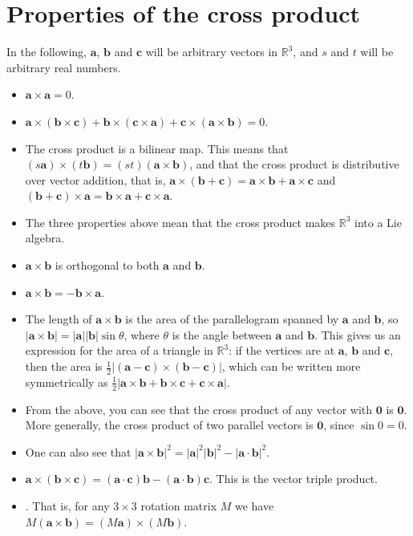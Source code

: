 \documentclass{article}
\def\R{\mathbb{R}}
\def\vec#1{\mathbf{#1}}   %
\begin{document}
\section*{Properties of the cross product}
In the following, $\vec{a}$, $\vec{b}$ and $\vec{c}$ will be arbitrary vectors in $\R^3$, and $s$ and $t$ will be arbitrary real numbers.
\begin{itemize}
\item $\vec{a}\times\vec{a}=0$.
\item $\vec{a}\times(\vec{b}\times\vec{c})+\vec{b}\times(\vec{c}\times\vec{a})
+\vec{c}\times(\vec{a}\times\vec{b})=0$.
\item The cross product is a bilinear map.
This means that $(s\vec{a})\times(t\vec{b})=(st)(\vec{a}\times\vec{b})$,
and that the cross product is distributive over vector addition,
that is, $\vec{a}\times(\vec{b}+\vec{c})=\vec{a}\times\vec{b}+\vec{a}\times\vec{c}$
and
$(\vec{b}+\vec{c})\times\vec{a}=\vec{b}\times\vec{a}+\vec{c}\times\vec{a}$.
\item The three properties above mean that the cross product makes $\R^3$ into a Lie algebra.
\item $\vec{a}\times\vec{b}$ is orthogonal to both $\vec{a}$ and $\vec{b}$.
\item $\vec{a}\times\vec{b}=-\vec{b}\times\vec{a}$.
\item The length of $\vec{a}\times\vec{b}$ is the area of the parallelogram spanned by $\vec{a}$ and $\vec{b}$, so $|\vec{a}\times\vec{b}|=|\vec{a}||\vec{b}|\sin\theta$, where $\theta$ is the angle between $\vec{a}$ and $\vec{b}$. This gives us an expression for the area of a triangle in $\R^3$: if the vertices are at $\vec{a}$, $\vec{b}$ and $\vec{c}$, then the area is $\frac{1}{2}|(\vec{a}-\vec{c})\times(\vec{b}-\vec{c})|$, which can be written more symmetrically as  $\frac{1}{2}|\vec{a}\times\vec{b}+\vec{b}\times\vec{c}+\vec{c}\times\vec{a}|$.
\item From the above, you can see that the cross product of any vector with $\vec{0}$ is $\vec{0}$. More generally, the cross product of two parallel vectors is $\vec{0}$, since $\sin 0 = 0$.
\item One can also see that $|\vec{a}\times \vec{b}|^2=|\vec{a}|^2|\vec{b}|^2-|\vec{a}\cdot \vec{b}|^2$.
\item $\vec{a}\times(\vec{b}\times\vec{c})
=(\vec{a}\cdot\vec{c})\vec{b}-(\vec{a}\cdot\vec{b})\vec{c}$.
This is the vector triple product.
\item {}.
That is, for any $3\times 3$ rotation matrix $M$ we have
$M(\vec{a}\times\vec{b})=(M\vec{a})\times(M\vec{b})$.
\end{itemize}
\end{document}
